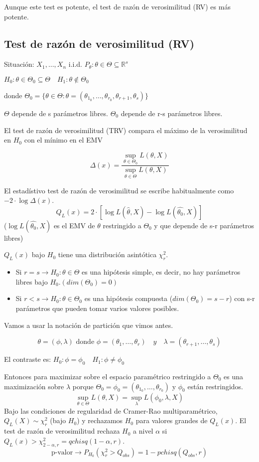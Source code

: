 Aunque este test es potente, el test de razón de verosimilitud (RV) es más potente.

\subsection{Test de razón de verosimilitud (RV)}

Situación: $X_1,\dots,X_n$ i.i.d. $P_\theta:\theta \in \Theta \subseteq \mathbb{R}^s$

\(
H_0: \theta \in \Theta_0 \subseteq \Theta \quad H_1: \theta \notin \Theta_0
\)

donde $\Theta_0=\{
    \theta \in \Theta: \theta=(\theta_{1_0},\dots,\theta_{r_0},\theta_{r+1},\theta_s)
\}$

$\Theta$ depende de s parámetros libres. $\Theta_0$ depende de r-s parámetros libres.

El test de razón de verosimilitud (TRV) compara el máximo de la verosimilitud en $H_0$ con el mínimo en el EMV

\[
\Delta(x)=\frac{\sup_{\theta \in \Theta_0} L(\theta,X)}{\sup_{\theta \in \Theta} L(\theta,X)}
\]

El estadístivo test de razón de verosimilitud se escribe habitualmente como $-2 \cdot \log \Delta(x)$.
\[
Q_L(x)=2 \cdot [\log L(\widehat{\theta},X)-\log L(\widehat{\theta_0},X)]
\]
($\log L(\widehat{\theta_0},X)$ es el EMV de $\theta$ restringido a $\Theta_0$ y que depende de s-r parámetros libres)

$Q_L(x)$ bajo $H_0$ tiene una distribución asintótica $\chi^2_r$.
\begin{itemize}
    \item Si $r=s \to H_0:\theta \in \Theta$ es una hipótesis simple, es decir, no hay parámetros libres bajo $H_0.(dim(\Theta_0)=0)$
    \item Si $r<s \to H_0:\theta \in \Theta_0$ es una hipótesis compuesta ($dim(\Theta_0)=s-r$) con s-r parámetros que pueden tomar varios valores posibles.
\end{itemize}

Vamos a usar la notación de partición que vimos antes.

\[
\theta=(\phi,\lambda) \text{ donde } \phi=(\theta_1,\dots,\theta_r) \quad y \quad \lambda=(\theta_{r+1},\dots,\theta_s)
\]

El contraste es: $H_0:\phi=\phi_0 \quad H_1:\phi \neq \phi_0$

Entonces para maximizar sobre el espacio paramétrico restringido a $\Theta_0$ es una maximización sobre $\lambda$ porque
$\Theta_0=\phi_0=(\theta_{1_0},\dots,\theta_{r_0})$ y $\phi_0$ están restringidos.
$$\sup_{\theta \in \Theta}L(\theta,X)=\sup_\lambda L(\phi_0,\lambda,X)$$
\newpage
Bajo las condiciones de regularidad de Cramer-Rao multiparamétrico, 
$Q_L(X) \sim \chi^2_r$ (bajo $H_0$)
y rechazamos $H_0$ para valores grandes de $Q_L(x)$. El test de razón de verosimilitud rechaza $H_0$ a nivel $\alpha$ si $Q_L(x)>\chi^2_{2-\alpha,r}=qchisq(1-\alpha,r)$.
\[
\text{p-valor} \to P_{H_0}(\chi^2_r>Q_{obs})=1-pchisq(Q_{obs},r)
\]
